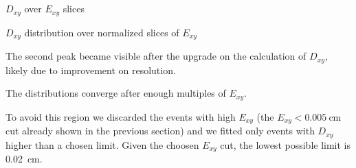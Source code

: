 \section{}

\begin{frame}{$D_{xy}$ over $E_{xy}$ slices}
	\begin{block}{}
		$D_{xy}$ distribution over normalized slices of $E_{xy}$
		
		The second peak became visible after the upgrade on the calculation of $D_{xy}$, likely due to improvement on resolution.
		
		The distributions converge after enough multiples of $E_{xy}$.
		
		To avoid this region we discarded the events with high $E_{xy}$ (the $E_{xy} < \SI{0.005}{\cm}$ cut already shown in the previous section) and we fitted only events with $D_{xy}$ higher than a chosen limit.
		Given the choosen $E_{xy}$ cut, the lowest possible limit is \SI{0.02}{\cm}.
	\end{block}
\end{frame}
